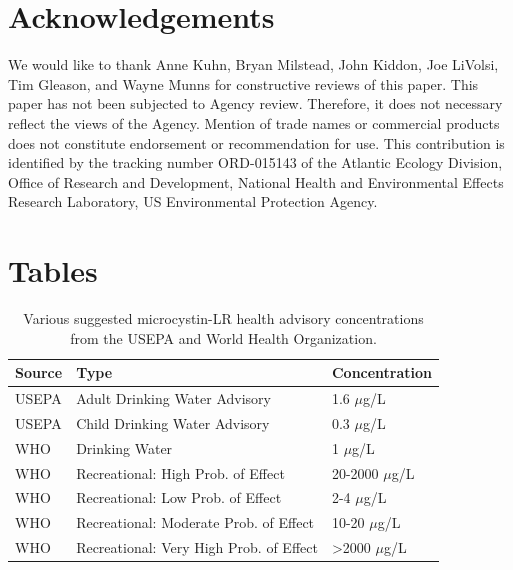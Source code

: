 \documentclass[10pt,a4paper,twocolumn]{article}
\begin{document}
\section{Acknowledgements}\label{acknowledgements}

We would like to thank Anne Kuhn, Bryan Milstead, John Kiddon, Joe
LiVolsi, Tim Gleason, and Wayne Munns for constructive reviews of this
paper. This paper has not been subjected to Agency review. Therefore, it
does not necessary reflect the views of the Agency. Mention of trade
names or commercial products does not constitute endorsement or
recommendation for use. This contribution is identified by the tracking
number ORD-015143 of the Atlantic Ecology Division, Office of Research
and Development, National Health and Environmental Effects Research
Laboratory, US Environmental Protection Agency.

\onecolumn

\section{Tables}\label{tables}

\begin{table}[ht]
\caption{Various suggested microcystin-LR health advisory 
                     concentrations from the USEPA and World Health Organization.} 
\label{tab:microcystin_levels}
\begin{tabular}{lll}
  \hline
Source & Type & Concentration \\ 
  \hline
USEPA & Adult Drinking Water Advisory & 1.6 $\mu$g/L \\ 
  USEPA & Child Drinking Water Advisory & 0.3 $\mu$g/L \\ 
  WHO & Drinking Water & 1 $\mu$g/L \\ 
  WHO & Recreational: High Prob. of Effect & 20-2000 $\mu$g/L \\ 
  WHO & Recreational: Low Prob. of Effect & 2-4 $\mu$g/L \\ 
  WHO & Recreational: Moderate Prob. of Effect & 10-20 $\mu$g/L \\ 
  WHO & Recreational: Very High Prob. of Effect & >2000 $\mu$g/L \\ 
   \hline
\end{tabular}
\end{table}
\end{document}
